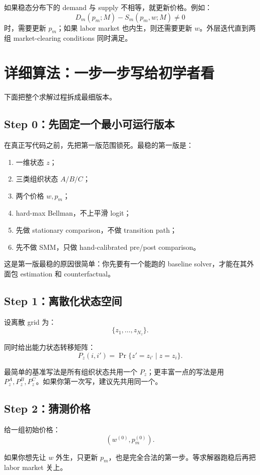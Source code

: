 \documentclass[12pt]{ctexart}
\begin{document}
如果稳态分布下的 demand 与 supply 不相等，就更新价格。例如：
\[
D_m(p_m;M)-S_m(p_m,w;M)\neq 0
\]
时，需要更新 $p_m$；如果 labor market 也内生，则还需要更新 $w$。外层迭代直到两组 market-clearing conditions 同时满足。

\section{详细算法：一步一步写给初学者看}

下面把整个求解过程拆成最细版本。

\subsection{Step 0：先固定一个最小可运行版本}

在真正写代码之前，先把第一版范围锁死。最稳的第一版是：
\begin{enumerate}
    \item 一维状态 $z$；
    \item 三类组织状态 $A/B/C$；
    \item 两个价格 $w,p_m$；
    \item hard-max Bellman，不上平滑 logit；
    \item 先做 stationary comparison，不做 transition path；
    \item 先不做 SMM，只做 hand-calibrated pre/post comparison。
\end{enumerate}

这是第一版最稳的原因很简单：你先要有一个能跑的 baseline solver，才能在其外面包 estimation 和 counterfactual。

\subsection{Step 1：离散化状态空间}

设离散 grid 为：
\[
\{z_1,\dots,z_{N_z}\}.
\]

同时给出能力状态转移矩阵：
\[
P_z(i,i')=\Pr\{z'=z_{i'}\mid z=z_i\}.
\]

最简单的基准写法是所有组织状态共用一个 $P_z$；更丰富一点的写法是用 $P_z^A,P_z^B,P_z^C$。如果你第一次写，建议先共用同一个。

\subsection{Step 2：猜测价格}

给一组初始价格：
\[
(w^{(0)},p_m^{(0)}).
\]

如果你想先让 $w$ 外生，只更新 $p_m$，也是完全合法的第一步。等求解器跑稳后再把 labor market 关上。
\end{document}
